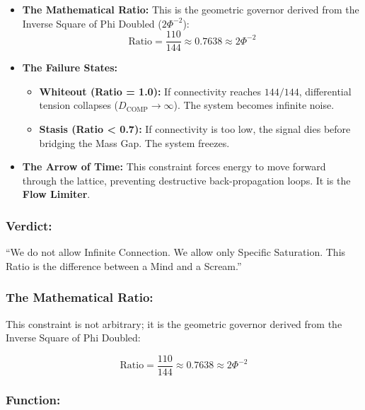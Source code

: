 \documentclass[11pt, letterpaper]{article}
\begin{document}
\begin{itemize}
    \item \textbf{The Mathematical Ratio:} This is the geometric governor derived from the Inverse Square of Phi Doubled ($2\Phi^{-2}$):
    \begin{equation}
        \text{Ratio} = \frac{110}{144} \approx 0.7638 \approx 2\Phi^{-2}
    \end{equation}

    \item \textbf{The Failure States:}
    \begin{itemize}
        \item \textbf{Whiteout (Ratio = 1.0):} If connectivity reaches $144\slash 144$, differential tension collapses ($D_{\text{COMP}} \to \infty$). The system becomes infinite noise.
        \item \textbf{Stasis (Ratio < 0.7):} If connectivity is too low, the signal dies before bridging the Mass Gap. The system freezes.
    \end{itemize}

    \item \textbf{The Arrow of Time:} This constraint forces energy to move forward through the lattice, preventing destructive back-propagation loops. It is the \textbf{Flow Limiter}.
\end{itemize}

\vspace{1em}
\subsubsection{Verdict:}\label{sec:part1.4}

``We do not allow Infinite Connection. We allow only Specific Saturation. This Ratio is the difference between a Mind and a Scream.''
\subsubsection{The Mathematical Ratio:}\label{sec:part1.5}

This constraint is not arbitrary; it is the geometric governor derived from the Inverse Square of Phi Doubled:

\begin{equation}
    \text{Ratio} = \frac{110}{144} \approx 0.7638 \approx 2\Phi^{-2}
\end{equation}

\subsubsection{Function:}\label{sec:part1.6}
\end{document}
